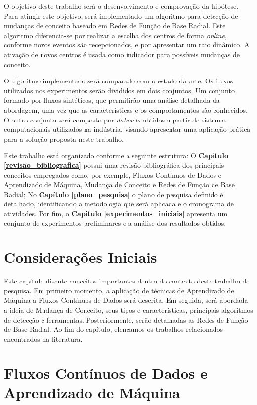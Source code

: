 \documentclass[qual, classic, a4paper]{ufbathesis}
\begin{document}
O objetivo deste trabalho será o desenvolvimento e comprovação da hipótese.
Para atingir este objetivo, será implementado um algoritmo para detecção de mudanças de conceito baseado em Redes de Função de Base Radial. 
Este algoritmo diferencia-se por realizar a escolha dos centros de forma \textit{online}, conforme novos eventos são recepcionados, 
e por apresentar um raio dinâmico. 
A ativação de novos centros é usada como indicador para possíveis mudanças de conceito.

O algoritmo implementado será comparado com o estado da arte. 
Os fluxos utilizados nos experimentos serão divididos em dois conjuntos. 
Um conjunto formado por fluxos sintéticos, que permitirão uma análise detalhada da abordagem, uma vez que as características e os comportamentos são conhecidos. 
O outro conjunto será composto por \textit{datasets} obtidos a partir de sistemas computacionais utilizados na indústria,
visando apresentar uma aplicação prática para a solução proposta neste trabalho.


Este trabalho está organizado conforme a seguinte estrutura: 
O \textbf{Capítulo \ref{revisao_bibliografica}} possui uma revisão bibliográfica dos principais conceitos empregados como, 
por exemplo, Fluxos Contínuos de Dados e Aprendizado de Máquina, Mudança de Conceito e Redes de Função de Base Radial; 
No \textbf{Capítulo \ref{plano_pesquisa}} o plano de pesquisa definido é detalhado, 
identificando a metodologia que será aplicada e o cronograma de atividades. 
Por fim, o \textbf{Capítulo \ref{experimentos_iniciais}} 
apresenta um conjunto de experimentos preliminares e a análise dos resultados obtidos.

 \label{revisao_bibliografica}
\section{Considerações Iniciais}

Este capítulo discute conceitos importantes dentro do contexto deste trabalho de pesquisa.
Em primeiro momento, a aplicação de técnicas de Aprendizado de Máquina a Fluxos Contínuos de Dados será descrita.
Em seguida, será abordada a ideia de Mudança de Conceito, seus tipos e características, principais algoritmos de detecção e ferramentas.
Posteriormente, serão detalhadas as Redes de Função de Base Radial.
Ao fim do capítulo, elencamos os trabalhos relacionados encontrados na literatura.


\section{Fluxos Contínuos de Dados e Aprendizado de Máquina}
\end{document}
